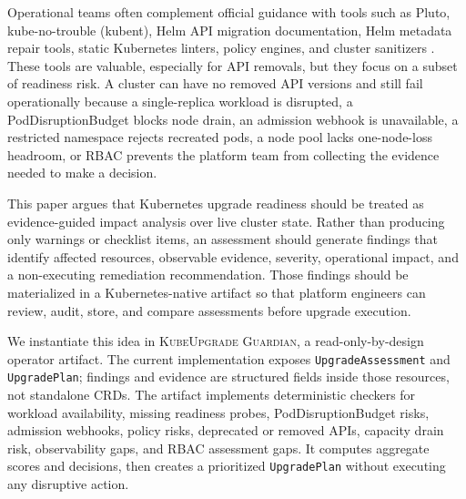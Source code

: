 \documentclass[10pt,journal]{IEEEtran}
\newcommand{\tool}{\textsc{KubeUpgrade Guardian}}
\newcommand{\crd}[1]{\texttt{#1}}
\begin{document}
Operational teams often complement official guidance with tools such as Pluto, kube-no-trouble (kubent), Helm API migration documentation, Helm metadata repair tools, static Kubernetes linters, policy engines, and cluster sanitizers \cite{pluto,kubent,helmKubernetesApis,helmMapKubeApis,kubeScore,kubeLinter,polaris,popeye,kubeBench,opa,gatekeeper,kyverno}. These tools are valuable, especially for API removals, but they focus on a subset of readiness risk. A cluster can have no removed API versions and still fail operationally because a single-replica workload is disrupted, a PodDisruptionBudget blocks node drain, an admission webhook is unavailable, a restricted namespace rejects recreated pods, a node pool lacks one-node-loss headroom, or RBAC prevents the platform team from collecting the evidence needed to make a decision.

This paper argues that Kubernetes upgrade readiness should be treated as evidence-guided impact analysis over live cluster state. Rather than producing only warnings or checklist items, an assessment should generate findings that identify affected resources, observable evidence, severity, operational impact, and a non-executing remediation recommendation. Those findings should be materialized in a Kubernetes-native artifact so that platform engineers can review, audit, store, and compare assessments before upgrade execution.

We instantiate this idea in \tool, a read-only-by-design operator artifact. The current implementation exposes \crd{UpgradeAssessment} and \crd{UpgradePlan}; findings and evidence are structured fields inside those resources, not standalone CRDs. The artifact implements deterministic checkers for workload availability, missing readiness probes, PodDisruptionBudget risks, admission webhooks, policy risks, deprecated or removed APIs, capacity drain risk, observability gaps, and RBAC assessment gaps. It computes aggregate scores and decisions, then creates a prioritized \crd{UpgradePlan} without executing any disruptive action.
\end{document}
